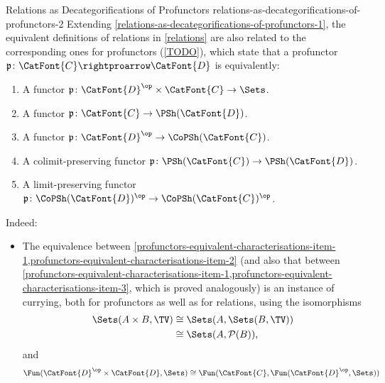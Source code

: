 \begin{remark}{Relations as Decategorifications of Profunctors \rmII}{relations-as-decategorifications-of-profunctors-2}%
    Extending \cref{relations-as-decategorifications-of-profunctors-1}, the equivalent definitions of relations in \cref{relations} are also related to the corresponding ones for profunctors (\cref{TODO}), which state that a profunctor $\mathfrak{p}\colon\CatFont{C}\rightproarrow\CatFont{D}$ is equivalently:
    \begin{enumerate}
        \item\label{profunctors-equivalent-characterisations-item-1}A                    functor $\mathfrak{p}\colon\CatFont{D}^{\op}\times\CatFont{C}\to\Sets$.
        \item\label{profunctors-equivalent-characterisations-item-2}A                    functor $\mathfrak{p}\colon\CatFont{C}\to\PSh(\CatFont{D})$.
        \item\label{profunctors-equivalent-characterisations-item-3}A                    functor $\mathfrak{p}\colon\CatFont{D}^{\op}\to\CoPSh(\CatFont{C})$.
        \item\label{profunctors-equivalent-characterisations-item-4}A colimit-preserving functor $\mathfrak{p}\colon\PSh(\CatFont{C})\to\PSh(\CatFont{D})$.
        \item\label{profunctors-equivalent-characterisations-item-5}A   limit-preserving functor $\mathfrak{p}\colon\CoPSh(\CatFont{D})^{\op}\to\CoPSh(\CatFont{C})^{\op}$.
    \end{enumerate}
    Indeed:
    \begin{itemize}
        \item The equivalence between \cref{profunctors-equivalent-characterisations-item-1,profunctors-equivalent-characterisations-item-2} (and also that between \cref{profunctors-equivalent-characterisations-item-1,profunctors-equivalent-characterisations-item-3}, which is proved analogously) is an instance of currying, both for profunctors as well as for relations, using the isomorphisms
            \begin{align*}
                \Sets(A\times B,\TV) &\cong \Sets(A,\Sets(B,\TV))\\
                                     &\cong \Sets(A,\mathcal{P}(B)),
            \end{align*}
            and
            \begin{align*}
                \Fun(\CatFont{D}^{\op}\times\CatFont{D},\Sets) &\cong \Fun(\CatFont{C},\Fun(\CatFont{D}^{\op},\Sets))\\

\end{align*}
\end{itemize}
\end{remark}
